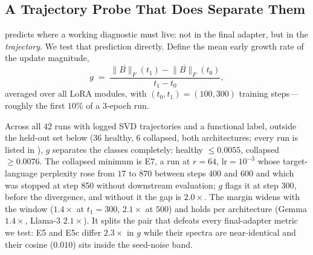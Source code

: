 \documentclass[11pt]{article}
\begin{document}
\subsection{A Trajectory Probe That Does Separate Them}
\label{sec:trajectory_probe}

 predicts where a working diagnostic must live: not in the final adapter, but in the \emph{trajectory}. We test that prediction directly. Define the mean early growth rate of the update magnitude,
\begin{equation}
g \;=\; \frac{\overline{\|B\|_F}(t_1) - \overline{\|B\|_F}(t_0)}{t_1 - t_0},
\label{eq:growth}
\end{equation}
averaged over all LoRA modules, with $(t_0,t_1) = (100,300)$ training steps---roughly the first $10\%$ of a 3-epoch run.

Across all 42 runs with logged SVD trajectories and a functional label, outside the held-out set below (36 healthy, 6 collapsed, both architectures; every run is listed in ), $g$ separates the classes completely: healthy $\leq 0.0055$, collapsed $\geq 0.0076$. The collapsed minimum is E7, a run at $r{=}64$, $\text{lr}{=}10^{-3}$ whose target-language perplexity rose from $17$ to $870$ between steps 400 and 600 and which was stopped at step 850 without downstream evaluation; $g$ flags it at step 300, before the divergence, and without it the gap is $2.0\times$. The margin widens with the window ($1.4\times$ at $t_1{=}300$, $2.1\times$ at $500$) and holds per architecture (Gemma $1.4\times$, Llama-3 $2.1\times$). It splits the pair that defeats every final-adapter metric we test: E5 and E5c differ $2.3\times$ in $g$ while their spectra are near-identical and their cosine ($0.010$) sits inside the seed-noise band.
\end{document}

